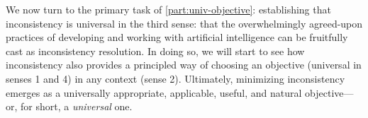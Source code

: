 {%
We now turn to the primary task of \cref{part:univ-objective}: establishing that inconsistency is universal in the third sense: that the overwhelmingly agreed-upon practices of developing and working with artificial intelligence can be fruitfully cast as inconsistency resolution. 
In doing so, we will start to see how inconsistency also provides a principled way of choosing an objective (universal in senses 1 and 4) in any context (sense 2).
Ultimately, minimizing inconsistency emerges as a universally appropriate, applicable, useful, and natural objective---or, for short, a \emph{universal} one. 


}%


%
